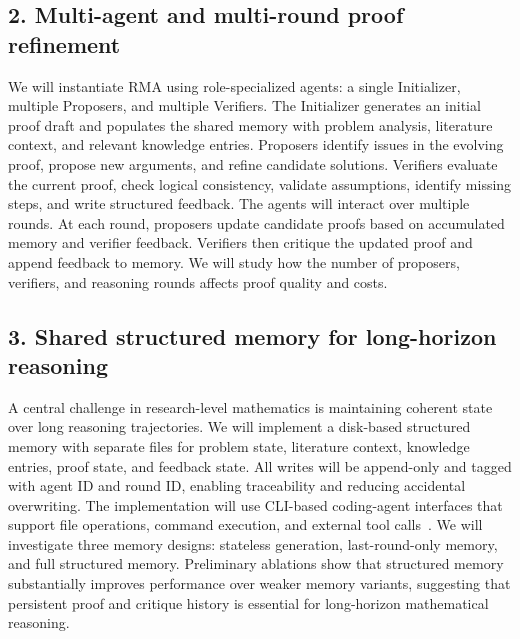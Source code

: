 \documentclass[11pt]{article}
\begin{document}
\subsection*{2. Multi-agent and multi-round proof refinement}
\vspace{-7pt}
We will instantiate RMA using role-specialized agents: a single Initializer, multiple Proposers, and multiple Verifiers. The Initializer generates an initial proof draft and populates the shared memory with problem analysis, literature context, and relevant knowledge entries. Proposers identify issues in the evolving proof, propose new arguments, and refine candidate solutions. Verifiers evaluate the current proof, check logical consistency, validate assumptions, identify missing steps, and write structured feedback. The agents will interact over multiple rounds. At each round, proposers update candidate proofs based on accumulated memory and verifier feedback. Verifiers then critique the updated proof and append feedback to memory. We will study how the number of proposers, verifiers, and reasoning rounds affects proof quality and costs.
\vspace{-7pt}
\subsection*{3. Shared structured memory for long-horizon reasoning}
\vspace{-7pt}
A central challenge in research-level mathematics is maintaining coherent state over long reasoning trajectories. We will implement a disk-based structured memory with separate files for problem state, literature context, knowledge entries, proof state, and feedback state. All writes will be append-only and tagged with agent ID and round ID, enabling traceability and reducing accidental overwriting. The implementation will use CLI-based coding-agent interfaces that support file operations, command execution, and external tool calls~\citep{openai_codex,anthropic_claude_code,google_geminicli}. We will investigate three memory designs: stateless generation, last-round-only memory, and full structured memory. Preliminary ablations show that structured memory substantially improves performance over weaker memory variants, suggesting that persistent proof and critique history is essential for long-horizon mathematical reasoning.
\vspace{-7pt}
\end{document}

